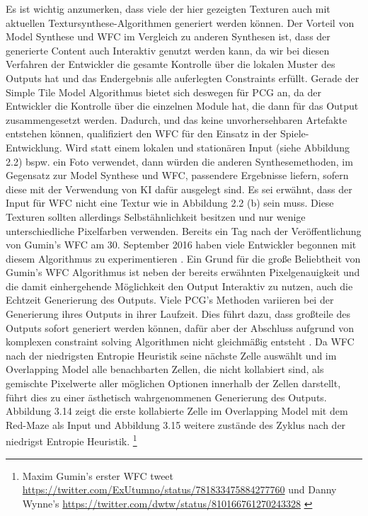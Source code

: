 \documentclass[12pt, a4paper,twoside,openany]{report} %
\begin{document}
Es ist wichtig anzumerken, dass viele der hier gezeigten Texturen auch mit aktuellen Textursynthese-Algorithmen generiert werden können.
Der Vorteil von Model Synthese und WFC im Vergleich zu anderen Synthesen ist, dass der generierte Content auch Interaktiv genutzt werden kann,
da wir bei diesen Verfahren der Entwickler die gesamte Kontrolle über die lokalen Muster des Outputs hat und das Endergebnis alle auferlegten Constraints erfüllt.
Gerade der Simple Tile Model Algorithmus bietet sich deswegen für PCG an, da der Entwickler die Kontrolle über die einzelnen Module hat,
die dann für das Output zusammengesetzt werden.
Dadurch, und das keine unvorhersehbaren Artefakte entstehen können, qualifiziert den WFC für den Einsatz in der Spiele-Entwicklung.
Wird statt einem lokalen und stationären Input {(siehe Abbildung 2.2)} bspw. ein Foto verwendet,
dann würden die anderen Synthesemethoden, im Gegensatz zur Model Synthese und WFC, passendere Ergebnisse liefern, sofern diese mit der Verwendung von KI dafür ausgelegt sind.
Es sei erwähnt, dass der Input für WFC nicht  eine Textur wie in Abbildung 2.2 {(b)} sein muss.
Diese Texturen sollten allerdings Selbstähnlichkeit besitzen und nur wenige unterschiedliche Pixelfarben verwenden.
Bereits ein Tag nach der Veröffentlichung von Gumin's WFC am 30. September 2016 haben viele Entwickler begonnen mit diesem Algorithmus zu experimentieren \cite{Karth2017WaveFunctionCollapseIC}.
Ein Grund für die große Beliebtheit von Gumin's WFC Algorithmus ist neben der bereits erwähnten Pixelgenauigkeit und die damit einhergehende Möglichkeit den Output Interaktiv zu nutzen,
auch die Echtzeit Generierung des Outputs.
Viele PCG's Methoden variieren bei der Generierung ihres Outputs in ihrer Laufzeit.
Dies führt dazu, dass großteile des Outputs sofort generiert werden können,
dafür aber der Abschluss aufgrund von komplexen constraint solving Algorithmen nicht gleichmäßig entsteht \cite{Karth2017WaveFunctionCollapseIC}.
Da WFC nach der niedrigsten Entropie Heuristik seine nächste Zelle auswählt und im Overlapping Model alle benachbarten Zellen, die nicht kollabiert sind,
als gemischte Pixelwerte aller möglichen Optionen innerhalb der Zellen darstellt, führt dies zu einer ästhetisch wahrgenommenen Generierung des Outputs.
Abbildung 3.14 zeigt die erste kollabierte Zelle im Overlapping Model mit dem Red-Maze als Input und Abbildung 3.15 weitere zustände des Zyklus nach der niedrigst Entropie Heuristik.
\footnote[4]{Maxim Gumin’s erster WFC tweet 
\newline
\url{https://twitter.com/ExUtumno/status/781833475884277760}
\newline
und Danny Wynne’s 
\newline
\url{https://twitter.com/dwtw/status/810166761270243328} \cite{Karth2017WaveFunctionCollapseIC}}
\end{document}
